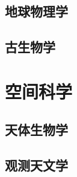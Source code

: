 \documentclass[UTF8]{NatureUniverse}
\begin{document}
\section{地球物理学}
\section{古生物学}



\chapter{空间科学}    %
\section{天体生物学}
\section{观测天文学}
\end{document}
